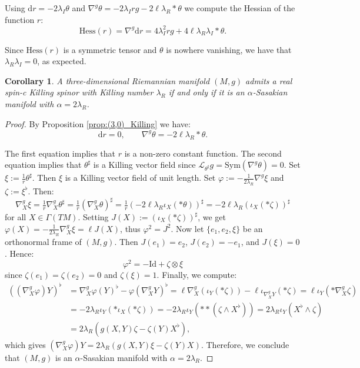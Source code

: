 \documentclass[10pt,a4paper,twoside,reqno]{amsart}
\theoremstyle{plain}
\newtheorem{cor}[thm]{Corollary}
\theoremstyle{definition}
\theoremstyle{remark}
\newcommand{\Sym}{\mathrm{Sym}}
\def\dd{\mathrm{d}}
\def\Id{\mathrm{Id}}
\def\dd{\mathrm{d}}
\def\Hess{\mathrm{Hess}}
\begin{document}
Using $\dd r=-2\lambda_I\theta$ and $\nabla^g\theta=-2\lambda_Irg-2\ell\lambda_R*\theta$ we compute the Hessian of the function $r$: $$\Hess(r)=\nabla^g\dd r=4\lambda_I^2rg+4\ell\lambda_R\lambda_I*\theta.$$

Since $\Hess(r)$ is a symmetric tensor and $\theta$ is nowhere vanishing, we have that $\lambda_R\lambda_I=0$, as expected.

\begin{cor}
A three-dimensional Riemannian manifold $(M,g)$ admits a real spin-c Killing spinor with Killing number $\lambda_R$ if and only if it is an $\alpha$-Sasakian manifold with $\alpha=2\lambda_R$.
\end{cor}

\begin{proof}
By Proposition \ref{prop:(3,0)_Killing} we have: $$\dd r=0,\qquad \nabla^g\theta=-2\ell\lambda_R*\theta.$$

The first equation implies that $r$ is a non-zero constant function. The second equation implies that $\theta^\sharp$ is a Killing vector field since $\mathscr{L}_{\theta^\sharp}g=\Sym(\nabla^g\theta)=0$. Set $\xi:=\frac{1}{r}\theta^\sharp$. Then $\xi$ is a Killing vector field of unit length. Set $\varphi:=-\frac{1}{2\lambda_R}\nabla^g\xi$ and $\zeta:=\xi^\flat$. Then: $$\nabla^g_X\xi=\tfrac{1}{r}\nabla^g_X\theta^\sharp=\tfrac{1}{r}(\nabla^g_X\theta)^\sharp=\tfrac{1}{r}(-2\ell\lambda_R\iota_X(*\theta))^\sharp=-2\ell\lambda_R(\iota_X(*\zeta))^\sharp$$ for all $X\in\Gamma(TM)$. Setting $J(X):=(\iota_X(*\zeta))^\sharp$, we get $\varphi(X)=-\frac{1}{2\lambda_R}\nabla^g_X\xi=\ell J(X)$, thus $\varphi^2=J^2$. Now let $\{e_1,e_2,\xi\}$ be an orthonormal frame of $(M,g)$. Then $J(e_1)=e_2$, $J(e_2)=-e_1$, and $J(\xi)=0$. Hence: $$\varphi^2=-\Id+\zeta\otimes\xi$$ since $\zeta(e_1)=\zeta(e_2)=0$ and $\zeta(\xi)=1$. Finally, we compute: 
\begin{align*}
((\nabla^g_X\varphi)Y)^\flat&=\nabla^g_X\varphi(Y)^\flat-\varphi(\nabla^g_XY)^\flat=\ell\nabla^g_X(\iota_Y(*\zeta))-\ell\iota_{\nabla^g_XY}(*\zeta)=\ell\iota_Y(*\nabla^g_X\zeta)\\
&=-2\lambda_R\iota_Y(*\iota_X(*\zeta))=-2\lambda_R\iota_Y(**(\zeta\wedge X^\flat))=2\lambda_R\iota_Y(X^\flat\wedge\zeta)\\
&=2\lambda_R(g(X,Y)\zeta-\zeta(Y)X^\flat),
\end{align*} 
which gives $(\nabla^g_X\varphi)Y=2\lambda_R(g(X,Y)\xi-\zeta(Y)X)$. Therefore, we conclude that $(M,g)$ is an $\alpha$-Sasakian manifold with $\alpha=2\lambda_R$.\medskip


\end{proof}
\end{document}
